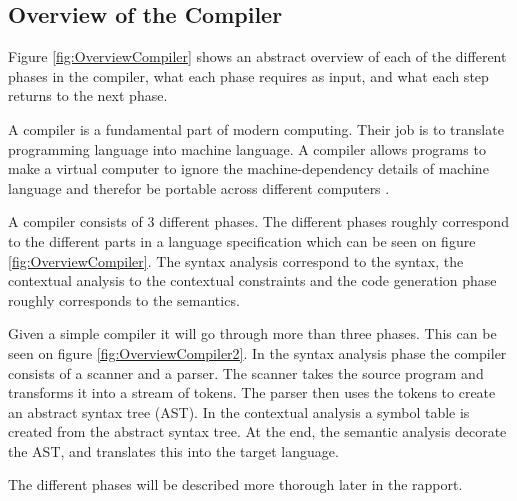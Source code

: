 \subsection{Overview of the Compiler}
\label{sec:OverviewCompiler}
Figure \ref{fig:OverviewCompiler} shows an abstract overview of each of the different phases in the compiler, what each phase requires as input, and what each step returns to the next phase.

A compiler is a fundamental part of modern computing. Their job is to translate programming language into machine language. A compiler allows programs to make a virtual computer to ignore the machine-dependency details of machine language and therefor be portable across different computers  \citep{CraftingACompiler}.

A compiler consists of 3 different phases. The different phases roughly correspond to the different parts in a language specification which can be seen on figure \ref{fig:OverviewCompiler}. The syntax analysis correspond to the syntax, the contextual analysis to the contextual constraints and the code generation phase roughly corresponds to the semantics.

Given a simple compiler it will go through more than three phases. This can be seen on figure \ref{fig:OverviewCompiler2}. In the syntax analysis phase the compiler consists of a scanner and a parser. The scanner takes the source program and transforms it into a stream of tokens. The parser then uses the tokens to create an abstract syntax tree (AST). In the contextual analysis a symbol table is created from the abstract syntax tree. At the end, the semantic analysis decorate the AST, and translates this into the target language.

The different phases will be described more thorough later in the rapport. 

